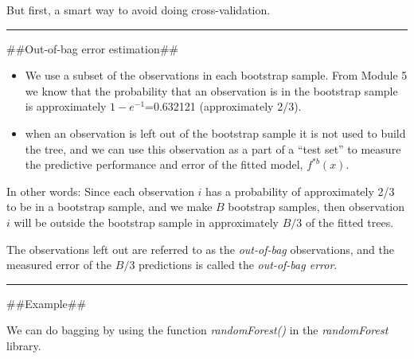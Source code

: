 \documentclass[]{article}
\newenvironment{Shaded}{\begin{snugshade}}{\end{snugshade}}
\newcommand{\DataTypeTok}[1]{\textcolor[rgb]{0.13,0.29,0.53}{#1}}
\newcommand{\DecValTok}[1]{\textcolor[rgb]{0.00,0.00,0.81}{#1}}
\newcommand{\KeywordTok}[1]{\textcolor[rgb]{0.13,0.29,0.53}{\textbf{#1}}}
\newcommand{\NormalTok}[1]{#1}
\newcommand{\OperatorTok}[1]{\textcolor[rgb]{0.81,0.36,0.00}{\textbf{#1}}}
\newcommand{\OtherTok}[1]{\textcolor[rgb]{0.56,0.35,0.01}{#1}}
\newcommand{\StringTok}[1]{\textcolor[rgb]{0.31,0.60,0.02}{#1}}
\providecommand{\tightlist}{%
  \setlength{\itemsep}{0pt}\setlength{\parskip}{0pt}}
\begin{document}
But first, a smart way to avoid doing cross-validation.

\begin{center}\rule{0.5\linewidth}{\linethickness}\end{center}

\#\#Out-of-bag error estimation\#\#

\begin{itemize}
\tightlist
\item
  We use a subset of the observations in each bootstrap sample. From
  Module 5 we know that the probability that an observation is in the
  bootstrap sample is approximately \(1-e^{-1}\)=0.632121 (approximately
  2/3).
\item
  when an observation is left out of the bootstrap sample it is not used
  to build the tree, and we can use this observation as a part of a
  ``test set'' to measure the predictive performance and error of the
  fitted model, \(f^{*b}(x)\).
\end{itemize}

In other words: Since each observation \(i\) has a probability of
approximately 2/3 to be in a bootstrap sample, and we make \(B\)
bootstrap samples, then observation \(i\) will be outside the bootstrap
sample in approximately \(B/3\) of the fitted trees.

The observations left out are referred to as the \emph{out-of-bag}
observations, and the measured error of the \(B/3\) predictions is
called the \emph{out-of-bag error}.

\begin{center}\rule{0.5\linewidth}{\linethickness}\end{center}

\#\#Example\#\#

We can do bagging by using the function \emph{randomForest()} in the
\emph{randomForest} library.

\footnotesize

\begin{Shaded}
\end{Shaded}
\end{document}
